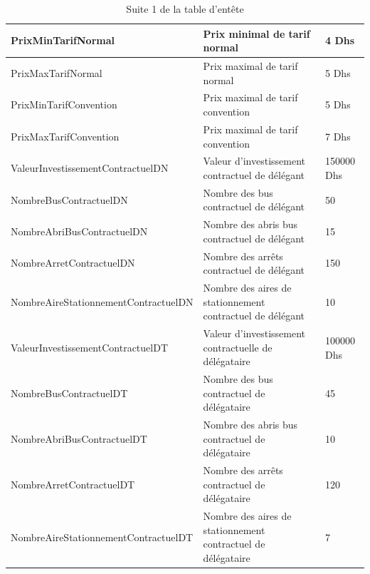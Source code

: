 \documentclass[a4paper]{report}
\begin{document}
\begin{doublespace}
\begin{table}[H]
\begin{center}
\begin{tabularx}{17.5cm}{|p{6.5cm}|X|p{2.1cm}|}
				\hline
				PrixMinTarifNormal                   & Prix minimal de tarif normal                                 & 4 Dhs            \\
				\hline
				PrixMaxTarifNormal                   & Prix maximal de tarif normal                                 & 5 Dhs            \\
				\hline
				PrixMinTarifConvention               & Prix maximal de tarif convention                             & 5 Dhs            \\
				\hline
				PrixMaxTarifConvention               & Prix maximal de tarif convention                             & 7 Dhs            \\
				\hline
				ValeurInvestissementContractuelDN    & Valeur d'investissement contractuel de délégant              & 150000 Dhs       \\
				\hline
				NombreBusContractuelDN               & Nombre des bus contractuel de délégant                       & 50               \\
				\hline
				NombreAbriBusContractuelDN           & Nombre des abris bus contractuel de délégant                 & 15               \\
				\hline
				NombreArretContractuelDN             & Nombre des arrêts contractuel de délégant                    & 150              \\
				\hline
				NombreAireStationnementContractuelDN & Nombre des aires de stationnement contractuel de délégant    & 10               \\
				\hline
				ValeurInvestissementContractuelDT    & Valeur d'investissement contractuelle de délégataire         & 100000 Dhs       \\
				\hline
				NombreBusContractuelDT               & Nombre des bus contractuel de délégataire                    & 45               \\
				\hline
				NombreAbriBusContractuelDT           & Nombre des abris bus contractuel de délégataire              & 10               \\
				\hline
				NombreArretContractuelDT             & Nombre des arrêts contractuel de délégataire                 & 120              \\
				\hline
				NombreAireStationnementContractuelDT & Nombre des aires de stationnement contractuel de délégataire & 7                \\
				\hline
			\end{tabularx}
			\caption{Suite 1 de la table d'entête}
		\end{center}

\end{table}
\end{doublespace}
\end{document}
